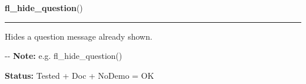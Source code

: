     \vspace{0.5ex}

\hspace{.8\funcindent}\begin{boxedminipage}{\funcwidth}

    \raggedright \textbf{fl\_hide\_question}()

    \vspace{-1.5ex}

    \rule{\textwidth}{0.5\fboxrule}
\setlength{\parskip}{2ex}

Hides a question message already shown.

-{}-
\setlength{\parskip}{1ex}
\textbf{Note:} 
e.g. fl\_hide\_question()


\textbf{Status:} 
Tested + Doc + NoDemo = OK


    \end{boxedminipage}

    \label{xformslib:flgoodies:fl_show_alert}

    \vspace{0.5ex}

